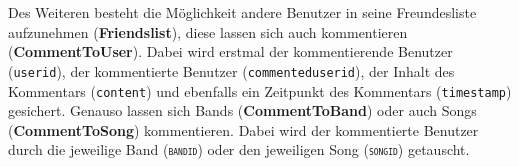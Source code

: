 \documentclass[11pt,a4paper,DIV=9]{scrartcl}
\begin{document}
\\\\
Des Weiteren besteht die M\"oglichkeit andere Benutzer in seine Freundesliste aufzunehmen (\textbf{Friendslist}), diese lassen sich auch kommentieren (\textbf{CommentToUser}). Dabei wird erstmal der kommentierende Benutzer (\texttt{userid}), der kommentierte Benutzer (\texttt{commenteduserid}), der Inhalt des Kommentars (\texttt{content}) und ebenfalls ein Zeitpunkt des Kommentars (\texttt{timestamp}) gesichert. Genauso lassen sich Bands (\textbf{CommentToBand}) oder auch Songs (\textbf{CommentToSong}) kommentieren. Dabei wird der kommentierte Benutzer durch die jeweilige Band (\texttt{\textsc{bandid}}) oder den jeweiligen Song (\texttt{\textsc{songid}}) getauscht.
\\
\end{document}
